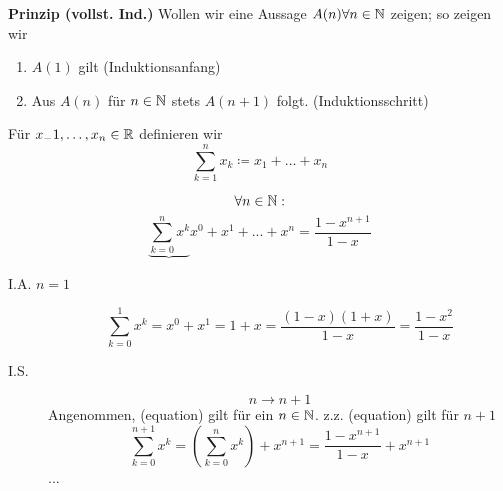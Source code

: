 \documentclass[consecutivenumbering]{gadsescript}
\begin{document}
\textbf{Prinzip (vollst. Ind.)} Wollen wir eine Aussage $ A(n) \forall n \in \mathbb{N} $ zeigen; so zeigen wir
\begin{enumerate}[label=(\roman*)]
	\item $ A(1) $ gilt (Induktionsanfang)
	\item Aus $ A(n) $ für $ n \in \mathbb{N} $ stets $ A(n+1) $ folgt. (Induktionsschritt)
\end{enumerate}

\begin{definition}[Summen]
	Für $x_-1, \dotsc, x_n \in \mathbb{R} $ definieren wir
	\[ \sum_{k = 1}^{n} x_k \coloneqq x_1 + \dotsc + x_n \]
\end{definition}

\begin{example}
	\[ \forall n \in \mathbb{N} : \]
	\begin{equation}
		\underbrace{\sum_{k=0}^{n} x^k}{x^0 + x^1 + ... + x^n} =  \frac{1-x^{n+1}}{1-x}
	\end{equation}
	
	\begin{description}
		\item[I.A. $n = 1$]
			\[ \sum_{k=0}^{1}x^k = x^0 + x^1 = 1+x = \frac{(1-x)(1+x)}{1-x} = \frac{1-x^2}{1-x} \]
		\item[I.S.]
			\[ n \to n+1 \] Angenommen, (equation) gilt für ein $n \in \mathbb{N} $.
			z.z. (equation) gilt für $ n + 1 $
			\[ \sum_{k=0}^{n+1}x^k = \left( \sum_{k=0}^{n}x^k\right) + x^{n+1} =  \frac{1 - x^{n + 1}}{1 - x} + x^{n + 1}\]
			...
	\end{description}
\end{example}
\end{document}
